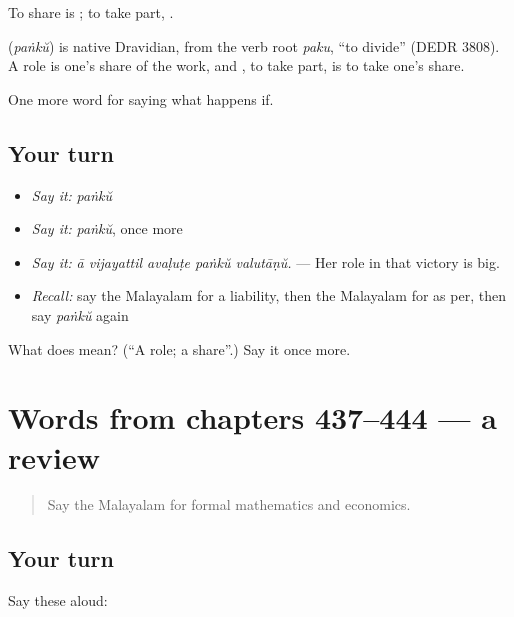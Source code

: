 To share is ; to take part, .

\begin{cousinweb}
\textbf{} (\emph{paṅkŭ}) is native Dravidian, from the verb root \emph{paku}, \textquotedblleft{}to divide\textquotedblright{} (DEDR 3808). A role is one's share of the work, and , to take part, is to take one's share.
\end{cousinweb}

\begin{grammarlens}[title={What you've built}]
One more word for saying what happens if.
\end{grammarlens}

\subsection*{Your turn}
\begin{itemize}
\raggedright
  \item \emph{Say it:} \emph{paṅkŭ}
  \item \emph{Say it:} \emph{paṅkŭ}, once more
  \item \emph{Say it:} \emph{ā vijayattil avaḷuṭe paṅkŭ valutāṇŭ.} — Her role in that victory is big.
  \item \emph{Recall:} say the Malayalam for a liability, then the Malayalam for as per, then say \emph{paṅkŭ} again
\end{itemize}

\begin{tcolorbox}[breakable,colback=teal!4,colframe=teal!35!black,title={Before you move on}]
What does  mean? (\textquotedblleft{}A role; a share\textquotedblright{}.) Say it once more.
\end{tcolorbox}
\section[(dialogue)]{Words from chapters 437–444 — a review}

\label{lesson:ML-R444-review-437-444}



\begin{quote}
Say the Malayalam for formal mathematics and economics.
\end{quote}

\subsection*{Your turn}
Say these aloud:

